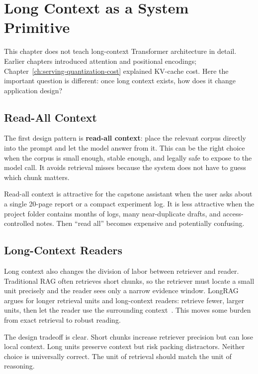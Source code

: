 \section{Long Context as a System Primitive}
\label{sec:ch20-long-context-primitive}

This chapter does not teach long-context Transformer architecture in detail. Earlier chapters introduced attention and positional encodings; Chapter~\ref{ch:serving-quantization-cost} explained KV-cache cost. Here the important question is different: once long context exists, how does it change application design?

\subsection{Read-All Context}

The first design pattern is \textbf{read-all context}: place the relevant corpus directly into the prompt and let the model answer from it. This can be the right choice when the corpus is small enough, stable enough, and legally safe to expose to the model call. It avoids retrieval misses because the system does not have to guess which chunk matters.

Read-all context is attractive for the capstone assistant when the user asks about a single 20-page report or a compact experiment log. It is less attractive when the project folder contains months of logs, many near-duplicate drafts, and access-controlled notes. Then ``read all'' becomes expensive and potentially confusing.

\subsection{Long-Context Readers}

Long context also changes the division of labor between retriever and reader. Traditional RAG often retrieves short chunks, so the retriever must locate a small unit precisely and the reader sees only a narrow evidence window. LongRAG argues for longer retrieval units and long-context readers: retrieve fewer, larger units, then let the reader use the surrounding context~\cite{jiang2024longrag}. This moves some burden from exact retrieval to robust reading.

The design tradeoff is clear. Short chunks increase retriever precision but can lose local context. Long units preserve context but risk packing distractors. Neither choice is universally correct. The unit of retrieval should match the unit of reasoning.

